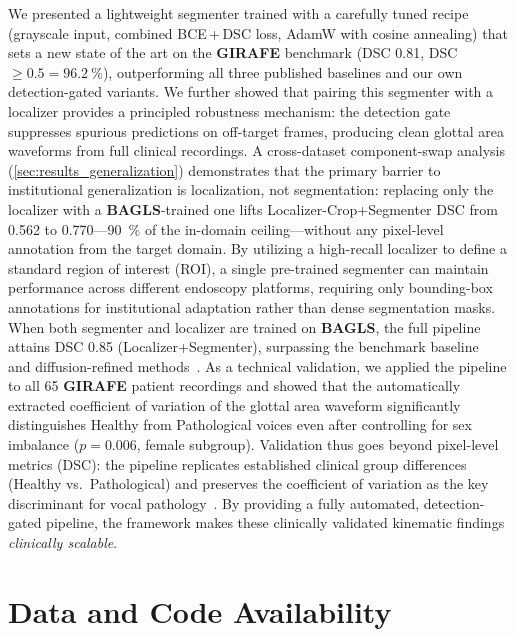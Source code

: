 \documentclass[preprint,12pt]{elsarticle}
\newcommand{\girafe}{\textbf{GIRAFE}}
\newcommand{\bagls}{\textbf{BAGLS}}
\newcommand{\yolounet}{Localizer+Segmenter}
\newcommand{\yolocrop}{Localizer-Crop+Segmenter}
\begin{document}
We presented a lightweight segmenter trained with a carefully tuned recipe
(grayscale input, combined BCE\,+\,DSC loss, AdamW with cosine annealing)
that sets a new state of the art on the \girafe{} benchmark
(DSC \num{0.81}, DSC${\geq}0.5 = \SI{96.2}{\%}$), outperforming all
three published baselines and our own detection-gated variants.
We further showed that pairing this segmenter with a localizer
provides a principled robustness mechanism: the detection gate suppresses
spurious predictions on off-target frames, producing clean glottal area
waveforms from full clinical recordings.
A cross-dataset component-swap analysis (\cref{sec:results_generalization}) demonstrates
that the primary barrier to institutional generalization is localization,
not segmentation: replacing only the localizer with a \bagls{}-trained one
lifts \yolocrop{} DSC from \num{0.562} to \num{0.770}---\SI{90}{\%} of the
in-domain ceiling---without any pixel-level annotation from the target domain.
By utilizing a high-recall localizer to define a standard region of interest
(ROI), a single pre-trained segmenter can maintain performance across
different endoscopy platforms, requiring only bounding-box annotations for
institutional adaptation rather than dense segmentation masks.
When both segmenter and localizer are trained on \bagls{}, the full pipeline attains
DSC \num{0.85} (\yolounet{}), surpassing the benchmark
baseline~\cite{gomez2020bagls} and diffusion-refined
methods~\cite{wu2024medsegdiff}.
As a technical validation, we applied the pipeline to all \num{65}
\girafe{} patient recordings and showed that the automatically extracted
coefficient of variation of the glottal area waveform significantly
distinguishes Healthy from Pathological voices even after controlling for
sex imbalance ($p{=}0.006$, female subgroup).
Validation thus goes beyond pixel-level metrics (DSC): the pipeline
replicates established clinical group differences (Healthy vs.\
Pathological) and preserves the coefficient of variation as the key
discriminant for vocal pathology~\cite{patel2015kinematic,patel2016nodules}.
By providing a fully automated, detection-gated pipeline,
the framework makes these clinically validated kinematic findings
\emph{clinically scalable}.

\section*{Data and Code Availability}
\end{document}
